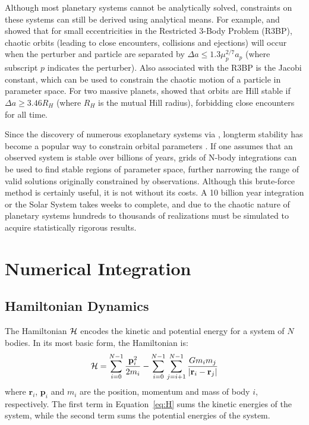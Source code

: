 Although most planetary systems cannot be analytically solved, constraints on these systems can still be derived using analytical means.
For example, \citet{Wisdom1980} and \citet{Duncan1989} showed that for small eccentricities in the Restricted 3-Body Problem (R3BP), chaotic orbits (leading to close encounters, collisions and ejections) will occur when the perturber and particle are separated by $\Delta a \le 1.3\mu_p^{2/7}a_p$ (where subscript $p$ indicates the perturber). 
Also associated with the R3BP is the Jacobi constant, which can be used to constrain the chaotic motion of a particle in parameter space. 
For two massive planets, \citet{Gladman1993} showed that orbits are Hill stable if $\Delta a \ge 3.46 R_H$ (where $R_H$ is the mutual Hill radius), forbidding close encounters for all time.

Since the discovery of numerous exoplanetary systems via \kep, longterm stability has become a popular way to constrain orbital parameters \citep{Lissauer2011, Steffen2013, Jontof-Hutter2014, Tamayo2015}. 
If one assumes that an observed system is stable over billions of years, grids of N-body integrations can be used to find stable regions of parameter space, further narrowing the range of valid solutions originally constrained by observations. 
Although this brute-force method is certainly useful, it is not without its costs. 
A 10 billion year integration or the Solar System takes weeks to complete, and due to the chaotic nature of planetary systems hundreds to thousands of realizations must be simulated to acquire statistically rigorous results. 

\section{Numerical Integration}
\subsection{Hamiltonian Dynamics}
The Hamiltonian $\mathcal{H}$ encodes the kinetic and potential energy for a system of $N$ bodies. 
In its most basic form, the Hamiltonian is:
\begin{equation}
\mathcal{H}  = \sum_{i=0}^{N-1} \frac{\textbf{p}_i^2}{2m_i} - \sum_{i=0}^{N-1} \sum_{j=i+1}^{N-1} \frac{Gm_im_j}{|\textbf{r}_i - \textbf{r}_j|}
\label{eq:H}
\end{equation}
where $\textbf{r}_i$, $\textbf{p}_i$ and $m_i$ are the position, momentum and mass of body $i$, respectively. 
The first term in Equation~\ref{eq:H} sums the kinetic energies of the system, while the second term sums the potential energies of the system.

